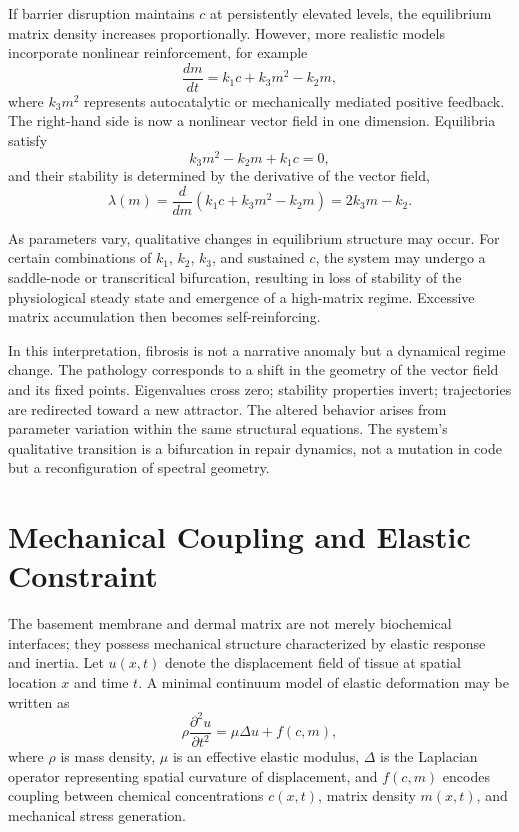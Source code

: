\documentclass[12pt]{book}
\begin{document}
If barrier disruption maintains $c$ at persistently elevated levels,
the equilibrium matrix density increases proportionally. However, more
realistic models incorporate nonlinear reinforcement, for example
\[
\frac{dm}{dt}
=
k_1 c
+
k_3 m^2
-
k_2 m,
\]
where $k_3 m^2$ represents autocatalytic or mechanically mediated
positive feedback. The right-hand side is now a nonlinear vector field
in one dimension. Equilibria satisfy
\[
k_3 m^2 - k_2 m + k_1 c = 0,
\]
and their stability is determined by the derivative of the vector
field,
\[
\lambda(m) = \frac{d}{dm}
\left(
k_1 c + k_3 m^2 - k_2 m
\right)
=
2 k_3 m - k_2.
\]

As parameters vary, qualitative changes in equilibrium structure may
occur. For certain combinations of $k_1$, $k_2$, $k_3$, and sustained
$c$, the system may undergo a saddle-node or transcritical
bifurcation, resulting in loss of stability of the physiological
steady state and emergence of a high-matrix regime. Excessive matrix
accumulation then becomes self-reinforcing.

In this interpretation, fibrosis is not a narrative anomaly but a
dynamical regime change. The pathology corresponds to a shift in the
geometry of the vector field and its fixed points. Eigenvalues cross
zero; stability properties invert; trajectories are redirected toward
a new attractor. The altered behavior arises from parameter variation
within the same structural equations. The system's qualitative
transition is a bifurcation in repair dynamics, not a mutation in
code but a reconfiguration of spectral geometry.

\section{Mechanical Coupling and Elastic Constraint}

The basement membrane and dermal matrix are not merely biochemical
interfaces; they possess mechanical structure characterized by
elastic response and inertia. Let $u(x,t)$ denote the displacement
field of tissue at spatial location $x$ and time $t$. A minimal
continuum model of elastic deformation may be written as
\[
\rho \frac{\partial^2 u}{\partial t^2}
=
\mu \Delta u
+
f(c,m),
\]
where $\rho$ is mass density, $\mu$ is an effective elastic modulus,
$\Delta$ is the Laplacian operator representing spatial curvature of
displacement, and $f(c,m)$ encodes coupling between chemical
concentrations $c(x,t)$, matrix density $m(x,t)$, and mechanical
stress generation.
\end{document}
